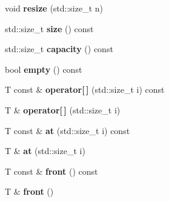 \begin{DoxyCompactItemize}
\item 
\hypertarget{classpel_1_1Vector_a27b207fb74d7049805667689bf05e050}{}void {\bfseries resize} (std\+::size\+\_\+t n)\label{classpel_1_1Vector_a27b207fb74d7049805667689bf05e050}

\item 
\hypertarget{classpel_1_1Vector_a970c467b27ead9928a3029c8afdd00bd}{}std\+::size\+\_\+t {\bfseries size} () const \label{classpel_1_1Vector_a970c467b27ead9928a3029c8afdd00bd}

\item 
\hypertarget{classpel_1_1Vector_a99bba8ff3612ec43cd7741994ecb71c8}{}std\+::size\+\_\+t {\bfseries capacity} () const \label{classpel_1_1Vector_a99bba8ff3612ec43cd7741994ecb71c8}

\item 
\hypertarget{classpel_1_1Vector_a6f9342e0078600ae052d2dbd308d0336}{}bool {\bfseries empty} () const \label{classpel_1_1Vector_a6f9342e0078600ae052d2dbd308d0336}

\item 
\hypertarget{classpel_1_1Vector_acbc29eace01e3c9e9ceaf22e217909b0}{}T const \& {\bfseries operator\mbox{[}$\,$\mbox{]}} (std\+::size\+\_\+t i) const \label{classpel_1_1Vector_acbc29eace01e3c9e9ceaf22e217909b0}

\item 
\hypertarget{classpel_1_1Vector_a564e4d29b6077ad48aaaea8e261ec179}{}T \& {\bfseries operator\mbox{[}$\,$\mbox{]}} (std\+::size\+\_\+t i)\label{classpel_1_1Vector_a564e4d29b6077ad48aaaea8e261ec179}

\item 
\hypertarget{classpel_1_1Vector_af618984ae8374a0a914dfa1869272a3e}{}T const \& {\bfseries at} (std\+::size\+\_\+t i) const \label{classpel_1_1Vector_af618984ae8374a0a914dfa1869272a3e}

\item 
\hypertarget{classpel_1_1Vector_aee4f827f17eced2fc86e4771aa6e81f4}{}T \& {\bfseries at} (std\+::size\+\_\+t i)\label{classpel_1_1Vector_aee4f827f17eced2fc86e4771aa6e81f4}

\item 
\hypertarget{classpel_1_1Vector_a33592f0390283e34523505cd657cce85}{}T const \& {\bfseries front} () const \label{classpel_1_1Vector_a33592f0390283e34523505cd657cce85}

\item 
\hypertarget{classpel_1_1Vector_ac87e39c46eafac986a0a403201c81abd}{}T \& {\bfseries front} ()\label{classpel_1_1Vector_ac87e39c46eafac986a0a403201c81abd}


\end{DoxyCompactItemize}
